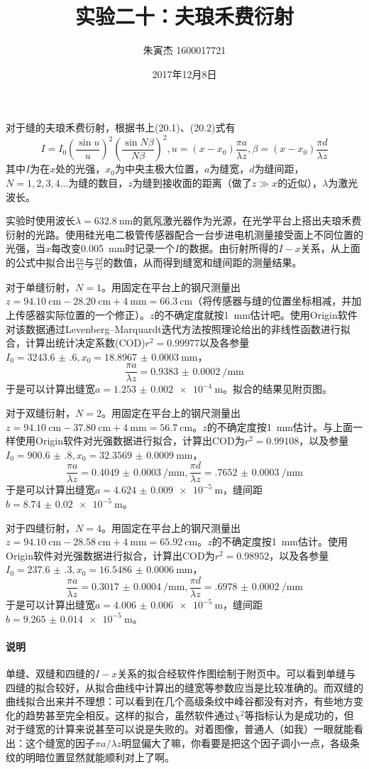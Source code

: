 \documentclass[UTF8]{ctexart}
\title{实验二十：夫琅禾费衍射}
\author{朱寅杰 1600017721}
\date{2017年12月8日}
\begin{document}
\maketitle
对于缝的夫琅禾费衍射，根据书上(20.1)、(20.2)式有
\[
I=I_0(\frac{\sin u}{u})^2(\frac{\sin{N\beta}}{N\beta})^2,u=(x-x_0)\frac{\pi a}{\lambda z},\beta=(x-x_0)\frac{\pi d}{\lambda z}
\]
其中$I$为在$x$处的光强，$x_0$为中央主极大位置，$a$为缝宽，$d$为缝间距，$N=1,2,3,4...$为缝的数目，$z$为缝到接收面的距离（做了$z\gg x$的近似），$\lambda$为激光波长。

实验时使用波长$\lambda=\SI{632.8}{\nm}$的氦氖激光器作为光源，在光学平台上搭出夫琅禾费衍射的光路。使用硅光电二极管传感器配合一台步进电机测量接受面上不同位置的光强，当$x$每改变\SI{0.005}{\mm}时记录一个$I$的数据。由衍射所得的$I-x$关系，从上面的公式中拟合出$\frac{\pi a}{\lambda z}$与$\frac{\pi d}{\lambda z}$的数值，从而得到缝宽和缝间距的测量结果。

对于单缝衍射，$N=1$。用固定在平台上的钢尺测量出$z=\SI{94.10}{\cm}-\SI{28.20}{\cm}+\SI{4}{\mm}=\SI{66.3}{\cm}$（将传感器与缝的位置坐标相减，并加上传感器实际位置的一个修正）。$z$的不确定度就按\SI{1}{\mm}估计吧。使用Origin软件对该数据通过Levenberg–Marquardt迭代方法按照理论给出的非线性函数进行拟合，计算出统计决定系数(COD)$r^2=0.99977$以及各参量$I_0=\num{3243.6(6)},x_0=\SI{18.8967(3)}{\mm}$，
\[\frac{\pi a}{\lambda z}=\SI{0.9383(2)}{\per\mm}\]
于是可以计算出缝宽$a=\SI{1.253(2)e-4}{\m}$。拟合的结果见附页图。

对于双缝衍射，$N=2$。用固定在平台上的钢尺测量出$z=\SI{94.10}{\cm}-\SI{37.80}{\cm}+\SI{4}{\mm}=\SI{56.7}{\cm}$。$z$的不确定度按\SI{1}{\mm}估计。与上面一样使用Origin软件对光强数据进行拟合，计算出COD为$r^2=0.99108$，以及参量$I_0=\num{900.6(8)},x_0=\SI{32.3569(9)}{\mm}$，
\[\frac{\pi a}{\lambda z}=\SI{0.4049(3)}{\per\mm},\frac{\pi d}{\lambda z}=\SI{.7652(3)}{\per\mm}\]
于是可以计算出缝宽$a=\SI{4.624(9)e-5}{\m}$，缝间距$b=\SI{8.74(2)e-5}{\m}$。

对于四缝衍射，$N=4$。用固定在平台上的钢尺测量出$z=\SI{94.10}{\cm}-\SI{28.58}{\cm}+\SI{4}{\mm}=\SI{65.92}{\cm}$。$z$的不确定度按\SI{1}{\mm}估计。使用Origin软件对光强数据进行拟合，计算出COD为$r^2=0.98952$，以及各参量$I_0=\num{237.6(3)},x_0=\SI{16.5486(6)}{\mm}$，
\[\frac{\pi a}{\lambda z}=\SI{0.3017(4)}{\per\mm},\frac{\pi d}{\lambda z}=\SI{.6978(2)}{\per\mm}\]
于是可以计算出缝宽$a=\SI{4.006(6)e-5}{\m}$，缝间距$b=\SI{9.265(14)e-5}{\m}$。
\paragraph{说明}
单缝、双缝和四缝的$I-x$关系的拟合经软件作图绘制于附页中。可以看到单缝与四缝的拟合较好，从拟合曲线中计算出的缝宽等参数应当是比较准确的。而双缝的曲线拟合出来并不理想：可以看到在几个高级条纹中峰谷都没有对齐，有些地方变化的趋势甚至完全相反。这样的拟合，虽然软件通过$\chi^2$等指标认为是成功的，但对于缝宽的计算来说甚至可以说是失败的。对着图像，普通人（如我）一眼就能看出：这个缝宽的因子$\pi a/\lambda z$明显偏大了嘛，你看要是把这个因子调小一点，各级条纹的明暗位置显然就能顺利对上了啊。
\end{document}
